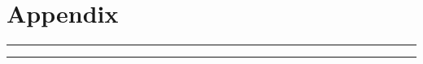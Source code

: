 
\onecolumn
\appendix
\section*{\huge Appendix}
\vspace{3mm}

\noindent\rule{\textwidth}{0.4pt}
\tableofcontents 
\let\addcontentsline\OriginalAddContentsLine
\noindent\rule{\textwidth}{0.4pt}










